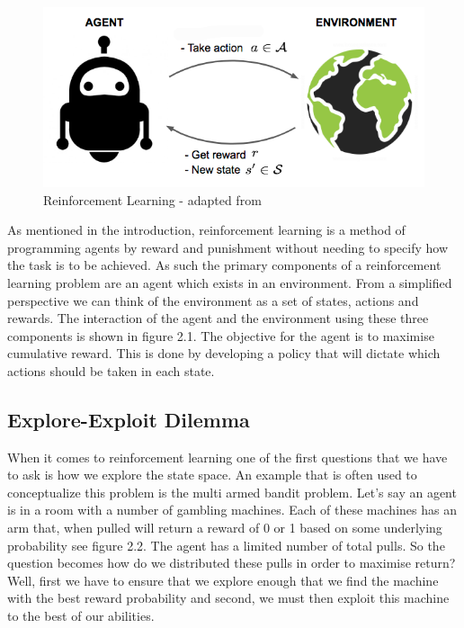 \begin{figure}[ht]
    \includegraphics[scale=.5]{images/RL_illustration.png}
    \caption{Reinforcement Learning - adapted from\citep{weng2018longpeek}}
\end{figure}

As mentioned in the introduction, reinforcement learning is a method of programming agents by reward and
punishment without needing to specify how the task is to be achieved.
As such the primary components of a reinforcement learning problem are an agent which exists in an environment.
From a simplified perspective we can think of the environment as a set of states, actions and rewards.
The interaction of the agent and the environment using these three components is shown in figure 2.1.
The objective for the agent is to maximise cumulative reward.
This is done by developing a policy that will dictate which actions should be taken in each state.

\subsection{Explore-Exploit Dilemma}\label{subsec:exploreExploit}
When it comes to reinforcement learning one of the first questions that we have to ask is how we explore
the state space.
An example that is often used to conceptualize this problem is the multi armed bandit problem.
Let's say an agent is in a room with a number of gambling machines.
Each of these machines has an arm that, when pulled will return a reward of 0 or 1 based on some underlying
probability\citep{kaelbling1996reinforcement} see figure 2.2.
The agent has a limited number of total pulls.
So the question becomes how do we distributed these pulls in order to maximise return?
Well, first we have to ensure that we explore enough that we find the machine with the best reward probability
and second, we must then exploit this machine to the best of our abilities.

